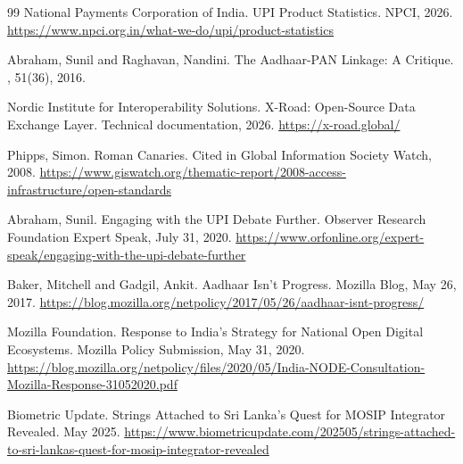 \documentclass{article}
\begin{document}
\begin{thebibliography}{99}
National Payments Corporation of India.
\newblock UPI Product Statistics.
\newblock NPCI, 2026.
\newblock \url{https://www.npci.org.in/what-we-do/upi/product-statistics}

Abraham, Sunil and Raghavan, Nandini.
\newblock The Aadhaar-PAN Linkage: A Critique.
, 51(36), 2016.

Nordic Institute for Interoperability Solutions.
\newblock X-Road: Open-Source Data Exchange Layer.
\newblock Technical documentation, 2026.
\newblock \url{https://x-road.global/}

Phipps, Simon.
\newblock Roman Canaries.
\newblock Cited in Global Information Society Watch, 2008.
\newblock \url{https://www.giswatch.org/thematic-report/2008-access-infrastructure/open-standards}

Abraham, Sunil.
\newblock Engaging with the UPI Debate Further.
\newblock Observer Research Foundation Expert Speak, July 31, 2020.
\newblock \url{https://www.orfonline.org/expert-speak/engaging-with-the-upi-debate-further}

Baker, Mitchell and Gadgil, Ankit.
\newblock Aadhaar Isn't Progress.
\newblock Mozilla Blog, May 26, 2017.
\newblock \url{https://blog.mozilla.org/netpolicy/2017/05/26/aadhaar-isnt-progress/}

Mozilla Foundation.
\newblock Response to India's Strategy for National Open Digital Ecosystems.
\newblock Mozilla Policy Submission, May 31, 2020.
\newblock \url{https://blog.mozilla.org/netpolicy/files/2020/05/India-NODE-Consultation-Mozilla-Response-31052020.pdf}

Biometric Update.
\newblock Strings Attached to Sri Lanka's Quest for MOSIP Integrator Revealed.
\newblock May 2025.
\newblock \url{https://www.biometricupdate.com/202505/strings-attached-to-sri-lankas-quest-for-mosip-integrator-revealed}

\end{thebibliography}
\end{document}
